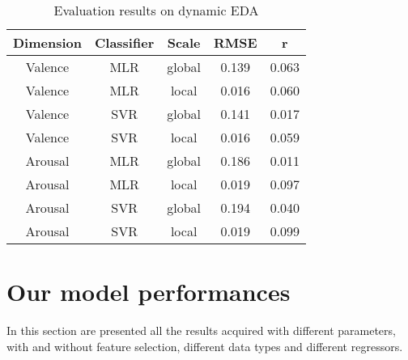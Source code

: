 \begin{table}[h!]
	\centering
	\begin{tabular}{|c|c|c|c|c|}
		\hline
		Dimension & Classifier & Scale & RMSE & r \\ [0.5ex] 
		\hline\hline Valence & MLR & global & 0.139 & 0.063 \\
		\hline Valence & MLR & local & 0.016 & 0.060 \\
		\hline Valence & SVR & global & 0.141 & 0.017 \\
		\hline Valence & SVR & local & 0.016 & 0.059 \\
		\hline Arousal & MLR & global & 0.186 & 0.011 \\
		\hline Arousal & MLR & local & 0.019 & 0.097 \\
		\hline Arousal & SVR & global & 0.194 & 0.040 \\
		\hline Arousal & SVR & local & 0.019 & 0.099 \\
		\hline
	\end{tabular}
	\caption{Evaluation results on dynamic EDA}
	\label{table:PMEmo_results_EDA}
\end{table}

\section{Our model performances}
In this section are presented all the results acquired with different parameters, with and without feature selection, different data types and different regressors.

